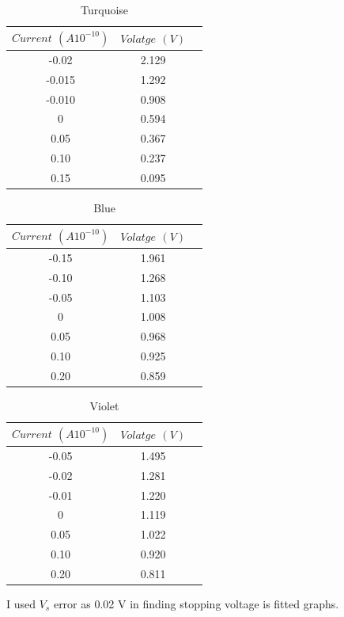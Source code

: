 \documentclass[aps,nofootinbib,onecolumn,groupedaddress,a4paper]{revtex4}
\begin{document}
\begin{table}
\caption{Turquoise \label{rawdata}}
\centering
\begin{tabular}{ccc}
\\
$Current$ $(A {10}^{-10})$ & $Volatge$ $(V)$ \\
\hline
-0.02 &  2.129   \\
-0.015 &  1.292  \\
-0.010 &  0.908 \\
0 & 0.594  \\
0.05 & 0.367  \\
0.10 & 0.237   \\
0.15 & 0.095   
\end{tabular}
\label{default}
\end{table}%

\begin{table}
\caption{Blue \label{rawdata}}
\centering
\begin{tabular}{ccc}
\\
$Current$ $(A {10}^{-10})$ & $Volatge$ $(V)$ \\
\hline
-0.15 &  1.961   \\
-0.10 &  1.268  \\
-0.05 &  1.103  \\
0 &      1.008  \\
0.05 &   0.968  \\
0.10 &   0.925   \\
0.20 &   0.859   
\end{tabular}
\label{default}
\end{table}

\begin{table}
\caption{Violet \label{rawdata}}
\centering
\begin{tabular}{ccc}
\\
$Current$ $(A {10}^{-10})$ & $Volatge$ $(V)$ \\
\hline
-0.05 &  1.495   \\
-0.02 &  1.281  \\
-0.01 &  1.220  \\
0 &      1.119\\
0.05 &   1.022  \\
0.10 &   0.920   \\
0.20 &   0.811   
\end{tabular}
\label{default}
\end{table}

I used ${V}_{s}$ error as 0.02 V in finding stopping voltage is fitted graphs. \\
\end{document}
